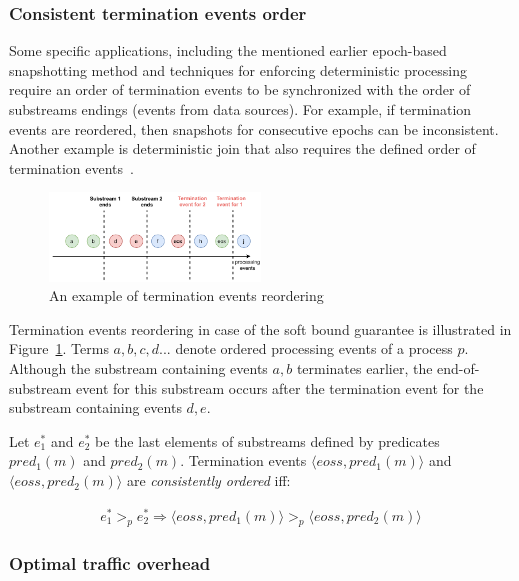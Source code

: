 \subsubsection{Consistent termination events order}
Some specific applications, including the mentioned earlier epoch-based snapshotting method and techniques for enforcing deterministic processing~\cite{we2018adbis} require an order of termination events to be synchronized with the order of substreams endings (events from data sources). For example, if termination events are reordered, then snapshots for consecutive epochs can be inconsistent. Another example is deterministic join that also requires the defined order of termination events~\cite{gulisano2016scalejoin}.

\begin{figure}[htbp]
  \centering
  \includegraphics[width=0.50\textwidth]{pics/notifications-reordering.pdf}
  \caption{An example of termination events reordering}
  \label{notifications_reordering}
\end{figure}

Termination events reordering in case of the soft bound guarantee is illustrated in Figure~\ref{notifications_reordering}. Terms $a,b,c,d...$ denote ordered processing events of a process $p$. Although the substream containing events $a,b$ terminates earlier, the end-of-substream event for this substream occurs after the termination event for the substream containing events $d,e$. 

Let $e^{*}_1$ and $e^{*}_2$ be the last elements of substreams defined by predicates $pred_1(m)$ and $pred_2(m)$. Termination events $\langle eoss, pred_1(m)\rangle$ and $\langle eoss, pred_2(m)\rangle$ are {\em consistently ordered} iff:

\begin{align*}
e^{*}_1 >_p e^{*}_2 \Longrightarrow \langle eoss, pred_1(m)\rangle >_p \langle eoss, pred_2(m)\rangle
\end{align*}

\subsubsection{Optimal traffic overhead}

